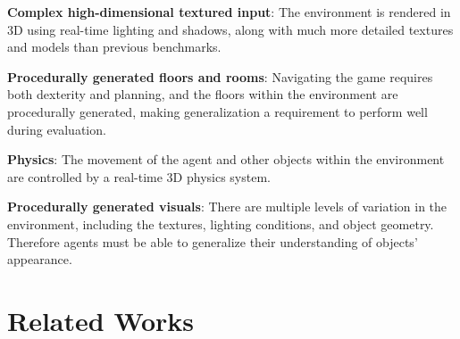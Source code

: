 \documentclass[conference]{IEEEtran}
\begin{document}
\textbf{Complex high-dimensional textured input}: The environment is rendered in 3D using real-time lighting and shadows, along with much more detailed textures and models than previous benchmarks. 

\textbf{Procedurally generated floors and rooms}: Navigating the game requires both dexterity and planning, and the floors within the environment are procedurally generated, making generalization a requirement to perform well during evaluation. 

\textbf{Physics}: The movement of the agent and other objects within the environment are controlled by a real-time 3D physics system.

\textbf{Procedurally generated visuals}: There are multiple levels of variation in the environment, including the textures, lighting conditions, and object geometry. Therefore agents must be able to generalize their understanding of objects’ appearance.



\section{Related Works}
\end{document}

